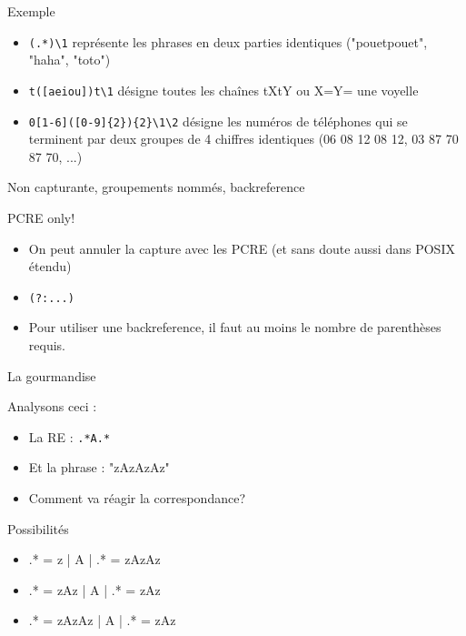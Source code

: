\begin{frame}[containsverbatim]{\ftitle}
\def\blocktitle{Exemple}
\begin{block}{\blocktitle}
\begin{itemize}
\item \verb!(.*)\1! représente les phrases en deux parties identiques ("pouetpouet", "haha", "toto")
\item \verb!t([aeiou])t\1! désigne toutes les chaînes tXtY ou X=Y= une voyelle
\item \verb!0[1-6]([0-9]{2}){2}\1\2! désigne les numéros de téléphones qui se terminent par deux groupes de 4 chiffres identiques
(06 08 12 08 12, 03 87 70 87 70, ...)
\end{itemize}
\end{block}
\end{frame}


\def\ftitle{Non capturante, groupements nommés, backreference}
\begin{frame}[containsverbatim]{\ftitle}
\def\blocktitle{PCRE only!}
\begin{block}{\blocktitle}
\begin{itemize}
\item On peut annuler la capture avec les PCRE (et sans doute aussi dans POSIX étendu)
\item \verb!(?:...)!
\item Pour utiliser une backreference, il faut au moins le nombre de parenthèses requis.
\end{itemize}
\end{block}
\end{frame}


\def\ftitle{La gourmandise}
\begin{frame}[containsverbatim]{\ftitle}
\def\blocktitle{Analysons ceci :}
\begin{block}{\blocktitle}
\begin{itemize}
\item La RE : \verb!.*A.*!
\item Et la phrase : "zAzAzAz"
\item Comment va réagir la correspondance?
\end{itemize}
\end{block}
\def\blocktitle{Possibilités}
\begin{block}{\blocktitle}
\begin{itemize}
\item .* = z | A | .* = zAzAz
\item .* = zAz | A | .* = zAz
\item .* = zAzAz | A | .* = zAz
\end{itemize}
\end{block}
\end{frame}


